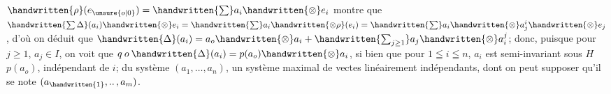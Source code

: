 
$\handwritten{\rho}(e_{\unsure{o|0}})=\handwritten{\sum}a_i\handwritten{\otimes}e_i$ montre que $\handwritten{\sum\Delta}(a_i)\handwritten{\otimes}e_i=\handwritten{\sum}a_i\handwritten{\otimes\rho}(e_i)=\handwritten{\sum}a_i\handwritten{\otimes}a_j^i\handwritten{\otimes}e_j$, d'où on déduit que $\handwritten{\Delta}(a_i)=a_o\handwritten{\otimes}a_i+\handwritten{\sum_{j\geq1}}a_j\handwritten{\otimes}a_i^j$; donc, puisque pour $j\geq1$, $a_j\in I$, on voit que $q\mathbin{o}\handwritten{\Delta}(a_i)=p(a_o)\handwritten{\otimes}a_i$, si bien que pour $1\leqq i\leqq n$, $a_i$ est semi-invariant sous $H$   $p(a_o)$, indépendant de $i$;  du système $(a_1,\ldots,a_n)$,  un système maximal de vectes linéairement indépendants, dont on peut supposer qu'il se note $(a_{\handwritten{1}},\mathinner{..},a_m)$. 

